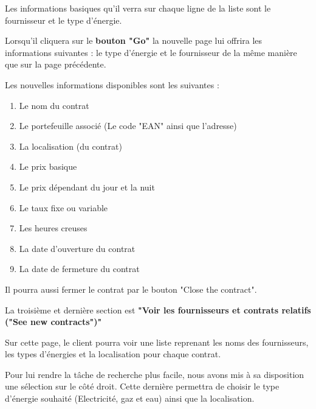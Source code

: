 \begin{flushleft}
Les informations basiques qu'il verra sur chaque ligne de la liste sont le fournisseur et le type d'énergie.
\end{flushleft}

\begin{flushleft}
Lorsqu'il cliquera sur le \textbf{bouton "Go"} la nouvelle page lui offrira les informations suivantes : le type d'énergie et le fournisseur de la même manière que sur la page précédente.
\end{flushleft}
\begin{flushleft}
Les nouvelles informations disponibles sont les suivantes :
\end{flushleft}
\begin{enumerate}
\item Le nom du contrat
\item Le portefeuille associé (Le code "EAN" ainsi que l'adresse)
\item La localisation (du contrat)
\item Le prix basique
\item Le prix dépendant du jour et la nuit
\item Le taux fixe ou variable
\item Les heures creuses
\item La date d'ouverture du contrat
\item La date de fermeture du contrat
\end{enumerate}
\begin{flushleft}
Il pourra aussi fermer le contrat par le bouton "Close the contract".
\end{flushleft}

\newpage

\begin{flushleft}
La troisième et dernière section est \textbf{"Voir les fournisseurs et contrats relatifs ("See new contracts")"}
\end{flushleft}
\begin{flushleft}
Sur cette page, le client pourra voir une liste reprenant les noms des fournisseurs, les types d'énergies et la localisation pour chaque contrat.
\end{flushleft}
\begin{flushleft}
Pour lui rendre la tâche de recherche plus facile, nous avons mis à sa disposition une sélection sur le côté droit.
Cette dernière permettra de choisir le type d'énergie souhaité (Electricité, gaz et eau) ainsi que la localisation.
\end{flushleft}

